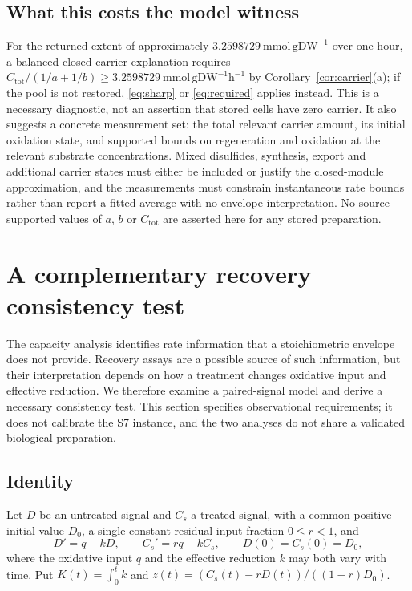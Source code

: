 \documentclass[11pt,a4paper]{article}
\theoremstyle{plain}
\theoremstyle{definition}
\theoremstyle{remark}
\newcommand{\Ctot}{C_{\mathrm{tot}}}
\newcommand{\mmolg}{\mathrm{mmol}\,\mathrm{gDW}^{-1}}
\begin{document}
\subsection{What this costs the model witness}
For the returned  extent of approximately $3.2598729\ \mmolg$ over
one hour, a balanced closed-carrier explanation requires
$\Ctot/(1/a+1/b)\ge3.2598729\ \mathrm{mmol}\,\mathrm{gDW}^{-1}\mathrm h^{-1}$
by Corollary~\ref{cor:carrier}(a); if the pool is not restored, \eqref{eq:sharp}
or \eqref{eq:required} applies instead. This is a necessary diagnostic, not an
assertion that stored cells have zero carrier. It also suggests a concrete
measurement set: the total relevant carrier amount, its initial oxidation
state, and supported bounds on regeneration and oxidation at the relevant
substrate concentrations. Mixed disulfides, synthesis, export and additional
carrier states must either be included or justify the closed-module
approximation, and the measurements must constrain instantaneous rate bounds
rather than report a fitted average with no envelope interpretation. No
source-supported values of $a$, $b$ or $\Ctot$ are asserted here for any stored
preparation.

\section{A complementary recovery consistency test}\label{sec:recovery}

The capacity analysis identifies rate information that a stoichiometric
envelope does not provide. Recovery assays are a possible source of such
information, but their interpretation depends on how a treatment changes
oxidative input and effective reduction. We therefore examine a paired-signal
model and derive a necessary consistency test. This section specifies
observational requirements; it does not calibrate the S7 instance, and the two
analyses do not share a validated biological preparation.

\subsection{Identity}
Let $D$ be an untreated signal and $C_s$ a treated signal, with a common
positive initial value $D_0$, a single constant residual-input fraction
$0\le r<1$, and
\begin{equation}\label{eq:pairedode}
D'=q-kD,\qquad C_s'=rq-kC_s,\qquad D(0)=C_s(0)=D_0 ,
\end{equation}
where the oxidative input $q$ and the effective reduction $k$ may both vary
with time. Put $K(t)=\int_0^tk$ and
$z(t)=(C_s(t)-rD(t))/((1-r)D_0)$.
\end{document}
